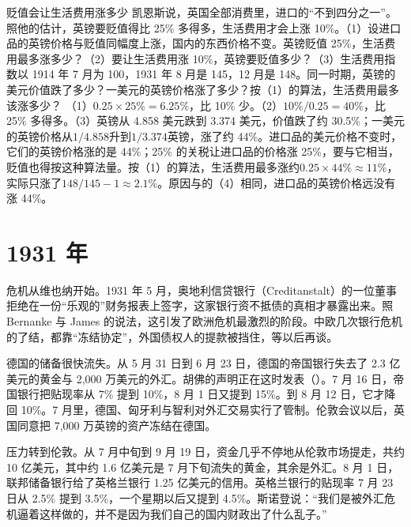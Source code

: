 \begin{example}{贬值会让生活费用涨多少}\label{ex:depressionworld-keynes}
凯恩斯说，英国全部消费里，进口的“不到四分之一”。照他的估计，英镑要贬值得比 25\% 多得多，生活费用才会上涨 10\%\cite{keynes1931}。（1）设进口品的英镑价格与贬值同幅度上涨，国内的东西价格不变。英镑贬值 25\%，生活费用最多涨多少？（2）要让生活费用涨 10\%，英镑要贬值多少？（3）生活费用指数以 1914 年 7 月为 100，1931 年 8 月是 145，12 月是 148\cite{boe2017}。同一时期，英镑的美元价值跌了多少？一美元的英镑价格涨了多少？按（1）的算法，生活费用最多该涨多少？
\solution （1）$0.25\times25\%=6.25\%$，比 10\% 少。（2）$10\%/0.25=40\%$，比 25\% 多得多。（3）英镑从 4.858 美元跌到 3.374 美元，价值跌了约 30.5\%；一美元的英镑价格从$1/4.858$升到$1/3.374$英镑，涨了约 44\%。进口品的美元价格不变时，它们的英镑价格涨的是 44\%；25\% 的关税让进口品的价格涨 25\%，要与它相当，贬值也得按这种算法量。按（1）的算法，生活费用最多涨约$0.25\times44\%\approx11\%$，实际只涨了$148/145-1\approx2.1\%$。原因与的（4）相同，进口品的英镑价格远没有涨 44\%。
\end{example}

\section{1931 年}\label{sec:depressionworld-1931}

危机从维也纳开始。1931 年 5 月，奥地利信贷银行（Creditanstalt）的一位董事拒绝在一份“乐观的”财务报表上签字，这家银行资不抵债的真相才暴露出来\cite{bernanke1991}。照 Bernanke 与 James 的说法，这引发了欧洲危机最激烈的阶段\cite{bernanke1991}。中欧几次银行危机的了结，都靠“冻结协定”，外国债权人的提款被挡住，等以后再谈\cite{bernanke1991}。

德国的储备很快流失。从 5 月 31 日到 6 月 23 日，德国的帝国银行失去了 2.3 亿美元的黄金与 2,000 万美元的外汇\cite{frb1931}。胡佛的声明正在这时发表（）。7 月 16 日，帝国银行把贴现率从 7\% 提到 10\%，8 月 1 日又提到 15\%\cite{frb1931}。到 8 月 12 日，它才降回 10\%\cite{frb1931}。7 月里，德国、匈牙利与智利对外汇交易实行了管制\cite{frb1931}。伦敦会议以后，英国同意把 7,000 万英镑的资产冻结在德国\cite{hansard1931}。

压力转到伦敦。从 7 月中旬到 9 月 19 日，资金几乎不停地从伦敦市场提走，共约 10 亿美元，其中约 1.6 亿美元是 7 月下旬流失的黄金，其余是外汇\cite{frb1931}。8 月 1 日，联邦储备银行给了英格兰银行 1.25 亿美元的信用\cite{frb1931}。英格兰银行的贴现率 7 月 23 日从 2.5\% 提到 3.5\%，一个星期以后又提到 4.5\%\cite{boe2017}。斯诺登说：“我们是被外汇危机逼着这样做的，并不是因为我们自己的国内财政出了什么乱子。”\cite{hansard1931}

